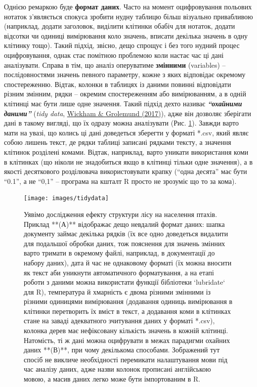 \documentclass[
  11pt,
]{book}
\begin{document}
Однією ремаркою буде \textbf{формат даних}. Часто на момент оцифровування польових нотаток з'являється спокуса зробити нудну таблицю більш візуально привабливою (наприклад, додати заголовок, виділити клітинки обабіч для нотаток, додати відсотки чи одиниці вимірювання коло значень, вписати декілька значень в одну клітинку тощо). Такий підхід, звісно, дещо спрощує і без того нудний процес оцифровування, однак стає помітною проблемою коли настає час ці дані аналізувати. Справа в тім, що аналіз оперуватиме \textbf{змінними} (variables) -- послідовностями значень певного параметру, кожне з яких відповідає окремому спостереженню. Відтак, колонки в таблицях із даними повинні відповідати різним змінним, рядки -- окремим спостереженням або вимірюванням, а в одній клітинці має бути лише одне значення. Такий підхід дехто називає \textbf{\emph{``охайними даними''}} (\emph{tidy data}, \href{https://r4ds.had.co.nz/tidy-data.html}{Wickham \& Grolemund (2017)}), адже він дозволяє зберігати дані в такому вигляді, що їх одразу можна аналізувати (Рис. \ref{fig:fig-3-14}). Завжди варто мати на увазі, що колись ці дані доведеться зберегти у форматі *.csv, який являє собою лишень текст, де рядки таблиці записані рядками тексту, а значення клітинок розділені комами. Відтак, наприклад, варто уникати використання коми в клітинках (що ніколи не знадобиться якщо в клітинці тільки одне значення), а в якості десяткового розділювача використовувати крапку (``одна десята'' має бути ``0.1'', а не ``0,1'' -- програма на кшталт R просто не зрозуміє що то за кома).

\begin{figure}
\texttt{[image: images/tidydata]} \caption{Уявімо дослідження ефекту структури лісу на населення птахів. Приклад **(А)** відображає дещо невдалий формат даних: шапка документу займає декілька рядків (їх все одно доведеться видалити для подальшої обробки даних, тож пояснення для значень змінних варто тримати в окремому файлі, наприклад, в документації до набору даних), дата й час не однаковому форматі (їх можна вносити як текст аби уникнути автоматичного форматування, а на етапі роботи з даними можна використати функції бібліотеки `lubridate` для R), температура й хмарність є двома різними змінними із різними одиницями вимірювання (додавання одиниць вимірювання в клітинки перетворить їх вміст в текст, а додавання коми в клітинках стане на заваді адекватного зчитування даних у форматі *.csv), колонка дерев має нефіксовану кількість значень в кожній клітинці. Натомість, ті ж дані можна оцифрувати в межах парадигми охайних даних **(В)**, при чому декількома способами. Зображений тут спосіб не викличе необхідності перемикати налаштування мови під час аналізу даних, адже назви колонок прописані англійською мовою, а масив даних легко може бути імпортованим в R.}\label{fig:fig-3-14}
\end{figure}
\end{document}
